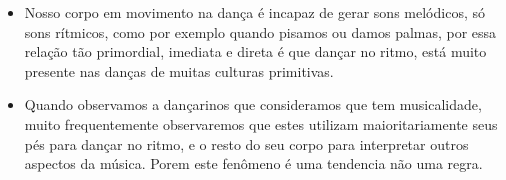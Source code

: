 \begin{tcbattention}
\begin{itemize}
\item Nosso corpo em movimento na dança é incapaz de gerar sons melódicos, 
só sons rítmicos, como por exemplo quando pisamos ou damos palmas, 
por essa relação tão primordial, imediata e direta é 
que dançar no ritmo, está muito presente 
nas danças de muitas culturas primitivas.
\item Quando observamos a dançarinos que consideramos que tem musicalidade,
muito frequentemente observaremos que estes utilizam maioritariamente seus pés para dançar no ritmo,
e o resto do seu corpo para interpretar outros aspectos da música.
Porem este fenômeno é uma tendencia não uma regra.
\end{itemize}
\end{tcbattention}
